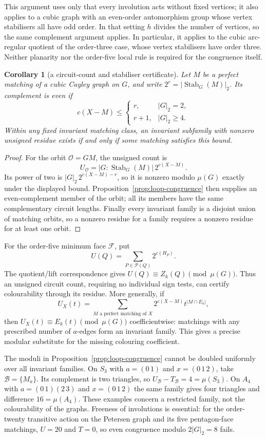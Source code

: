 \documentclass[11pt,a4paper]{article}
\newtheorem{corollary}[theorem]{Corollary}
\theoremstyle{definition}
\theoremstyle{remark}
\begin{document}
This argument uses only that every involution acts without fixed vertices; it also applies to a cubic graph with an even-order automorphism group whose vertex stabilisers all have odd order.  In that setting $h$ divides the number of vertices, so the same complement argument applies.  In particular, it applies to the cubic arc-regular quotient of the order-three case, whose vertex stabilisers have order three.  Neither planarity nor the order-five local rule is required for the congruence itself.

\begin{corollary}[a circuit-count and stabiliser certificate]\label{cor:loop-stabiliser}
Let $M$ be a perfect matching of a cubic Cayley graph on $G$, and write $2^r=|\operatorname{Stab}_G(M)|_2$.  Its complement is even if
\[
 c(X-M)\le
 \begin{cases}
 r,&|G|_2=2,\\
 r+1,&|G|_2\ge4.
 \end{cases}
\]
Within any fixed invariant matching class, an invariant subfamily with nonzero unsigned residue exists if and only if some matching satisfies this bound.
\end{corollary}
\begin{proof}
For the orbit $\mathcal O=GM$, the unsigned count is
\[
 U_{\mathcal O}=|G:\operatorname{Stab}_G(M)|\,2^{c(X-M)}.
\]
Its power of two is $|G|_2\,2^{c(X-M)-r}$, so it is nonzero modulo $\mu(G)$ exactly under the displayed bound.  Proposition~\ref{prop:loop-congruence} then supplies an even-complement member of the orbit; all its members have the same complementary circuit lengths.  Finally every invariant family is a disjoint union of matching orbits, so a nonzero residue for a family requires a nonzero residue for at least one orbit.
\end{proof}

For the order-five minimum face $\mathcal F$, put
\[
 U(Q)=\sum_{P\in\mathcal P(Q)}2^{c(H_P)}.
\]
The quotient/lift correspondence gives $U(Q)\equiv Z_k(Q)\pmod{\mu(G)}$.  Thus an unsigned circuit count, requiring no individual sign tests, can certify colourability through its residue.  More generally, if
\[
 U_X(t)=\sum_{M\text{ a perfect matching of }X}
             2^{c(X-M)}t^{|M\cap E_a|},
\]
then $U_X(t)\equiv E_k(t)\pmod{\mu(G)}$ coefficientwise: matchings with any prescribed number of $a$-edges form an invariant family.  This gives a precise modular substitute for the missing colouring coefficient.

The moduli in Proposition~\ref{prop:loop-congruence} cannot be doubled uniformly over all invariant families.  On $S_3$ with $a=(0\,1)$ and $x=(0\,1\,2)$, take $\mathcal B=\{M_a\}$.  Its complement is two triangles, so $U_{\mathcal B}-T_{\mathcal B}=4=\mu(S_3)$.  On $A_4$ with $a=(0\,1)(2\,3)$ and $x=(0\,1\,2)$ the same family gives four triangles and difference $16=\mu(A_4)$.  These examples concern a restricted family, not the colourability of the graphs.  Freeness of involutions is essential: for the order-twenty transitive action on the Petersen graph and its five pentagon-face matchings, $U=20$ and $T=0$, so even congruence modulo $2|G|_2=8$ fails.
\end{document}
